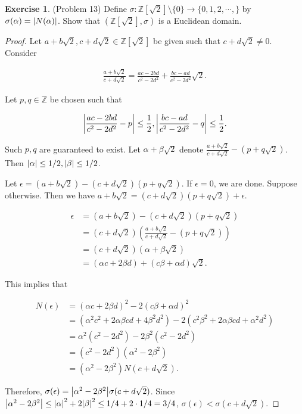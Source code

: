 \documentclass[12pt, psamsfonts]{amsart}
\theoremstyle{definition}
\newtheorem*{exer}{Exercise}
\theoremstyle{remark}
\numberwithin{equation}{section}
\begin{document}
\begin{exer}{(Problem 13)}
  Define $\sigma: \mathbb{Z}[\sqrt{2}] \setminus \{ 0 \} \rightarrow \{ 0, 1, 2, \cdots, \}$ by $\sigma(\alpha) = \abs{N(\alpha)}$.
  Show that $(\mathbb{Z}[\sqrt{2}], \sigma)$ is a Euclidean domain.
\end{exer}

\begin{proof}
  Let $a + b\sqrt{2}, c + d\sqrt{2} \in \mathbb{Z}[\sqrt{2}]$ be given such that $c + d\sqrt{2} \ne 0$.
  Consider

  \begin{align*}
    \frac{a + b\sqrt{2}}{c + d\sqrt{2}} = \frac{ac - 2bd}{c^2 - 2d^2} + \frac{bc - ad}{c^2 - 2d^2}\sqrt{2}.
  \end{align*}

  Let $p, q \in \mathbb{Z}$ be chosen such that

  \begin{align*}
    \abs{\frac{ac - 2bd}{c^2 - 2d^2} - p} \leq \frac{1}{2}, \abs{\frac{bc - ad}{c^2 - 2d^2} - q} \leq \frac{1}{2}.
  \end{align*}

  Such $p, q$ are guaranteed to exist.
  Let $\alpha + \beta\sqrt{2}$ denote $\frac{a + b\sqrt{2}}{c + d\sqrt{2}} - (p + q\sqrt{2})$.
  Then $\abs{\alpha} \leq 1/2, \abs{\beta} \leq 1/2$.

  Let $\epsilon = (a + b\sqrt{2}) - (c + d\sqrt{2})(p + q\sqrt{2})$.
  If $\epsilon = 0$, we are done.
  Suppose otherwise.
  Then we have $a + b\sqrt{2} = (c + d\sqrt{2})(p + q\sqrt{2}) + \epsilon$.

  \begin{align*}
    \epsilon
      &= (a + b\sqrt{2}) - (c + d\sqrt{2})(p + q\sqrt{2}) \\
      &= (c + d\sqrt{2})(\frac{a + b\sqrt{2}}{c + d\sqrt{2}} - (p + q\sqrt{2})) \\
      &= (c + d\sqrt{2})(\alpha + \beta\sqrt{2}) \\
      &= (\alpha c + 2\beta d) + (c\beta + \alpha d)\sqrt{2}.
  \end{align*}

  This implies that

  \begin{align*}
    N(\epsilon)
      &= (\alpha c + 2\beta d)^2 - 2(c\beta + \alpha d)^2 \\
      &= (\alpha^2 c^2 + 2\alpha\beta cd + 4\beta^2d^2) - 2(c^2\beta^2 + 2\alpha\beta cd + \alpha^2 d^2) \\
      &= \alpha^2(c^2 - 2d^2) - 2\beta^2(c^2 - 2d^2) \\
      &= (c^2 - 2d^2)(\alpha^2 - 2\beta^2) \\
      &= (\alpha^2 - 2\beta^2)N(c + d\sqrt{2}).
  \end{align*}

  Therefore, $\sigma(\epsilon) = \abs{\alpha^2 - 2\beta^2}\sigma(c + d\sqrt{2})$.
  Since $\abs{\alpha^2 - 2\beta^2} \leq \abs{\alpha}^2 + 2\abs{\beta}^2 \leq 1/4 + 2 \cdot 1/4 = 3/4$, $\sigma(\epsilon) < \sigma(c + d\sqrt{2})$.
\end{proof}
\end{document}

